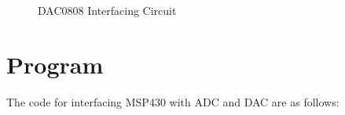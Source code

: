 \documentclass[12pt, letterpaper]{article}
\begin{document}
\begin{figure}[t]
	\centering
	\caption{DAC0808 Interfacing Circuit}
	\label{fig:DAC}
\end{figure}

\newpage
\section{Program}

The code for interfacing MSP430 with ADC and DAC are as follows:
\end{document}
